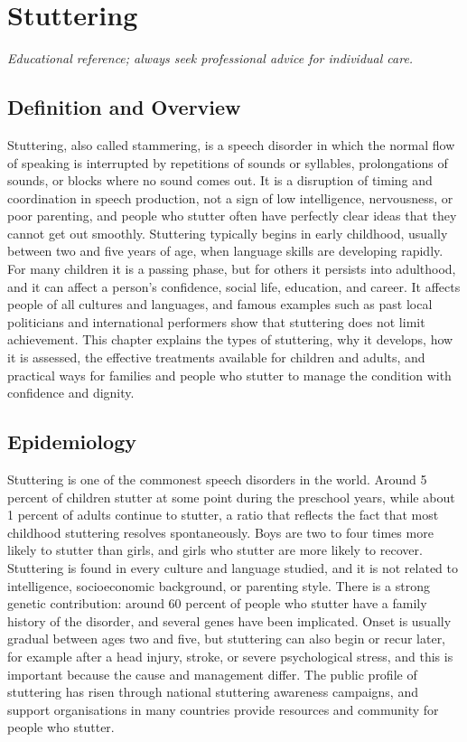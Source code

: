 \chapter{Stuttering}

\medskip
\noindent\textit{Educational reference; always seek professional advice for individual care.}

\section*{Definition and Overview}
Stuttering, also called stammering, is a speech disorder in which the normal flow of speaking is interrupted by repetitions of sounds or syllables, prolongations of sounds, or blocks where no sound comes out. It is a disruption of timing and coordination in speech production, not a sign of low intelligence, nervousness, or poor parenting, and people who stutter often have perfectly clear ideas that they cannot get out smoothly. Stuttering typically begins in early childhood, usually between two and five years of age, when language skills are developing rapidly. For many children it is a passing phase, but for others it persists into adulthood, and it can affect a person's confidence, social life, education, and career. It affects people of all cultures and languages, and famous examples such as past local politicians and international performers show that stuttering does not limit achievement. This chapter explains the types of stuttering, why it develops, how it is assessed, the effective treatments available for children and adults, and practical ways for families and people who stutter to manage the condition with confidence and dignity.

\section*{Epidemiology}
Stuttering is one of the commonest speech disorders in the world. Around 5 percent of children stutter at some point during the preschool years, while about 1 percent of adults continue to stutter, a ratio that reflects the fact that most childhood stuttering resolves spontaneously. Boys are two to four times more likely to stutter than girls, and girls who stutter are more likely to recover. Stuttering is found in every culture and language studied, and it is not related to intelligence, socioeconomic background, or parenting style. There is a strong genetic contribution: around 60 percent of people who stutter have a family history of the disorder, and several genes have been implicated. Onset is usually gradual between ages two and five, but stuttering can also begin or recur later, for example after a head injury, stroke, or severe psychological stress, and this is important because the cause and management differ. The public profile of stuttering has risen through national stuttering awareness campaigns, and support organisations in many countries provide resources and community for people who stutter.

